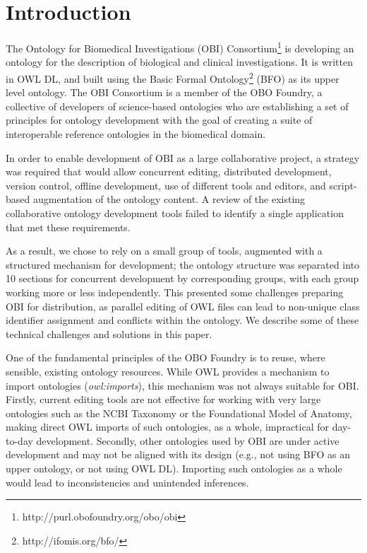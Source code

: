 \documentclass{elsart}       %
\begin{document}
\section{Introduction}
\label{intro}

The Ontology for Biomedical Investigations (OBI) Consortium\footnote{http://purl.obofoundry.org/obo/obi} is developing an ontology for the description of biological and clinical investigations.
It is written in OWL DL, and built using the Basic Formal Ontology\footnote{http://ifomis.org/bfo/} (BFO)\cite{bfo} as its upper level ontology.
The OBI Consortium is a member of the OBO Foundry\cite{foundry}, a collective of developers of science-based ontologies who are establishing a set of principles for ontology development with the goal of creating a suite of interoperable reference ontologies in the biomedical domain. 


In order to enable development of OBI as a large collaborative project, a strategy was required that would allow concurrent editing, distributed development, version control, offline development, use of different tools and editors, and script-based augmentation of the ontology content.
A review of the existing collaborative ontology development tools failed to identify a single application that met these requirements.

As a result, we chose to rely on a small group of tools, augmented with a structured mechanism for development; the ontology structure was separated into 10 sections for concurrent development by corresponding groups, with each group working more or less independently.
This presented some challenges preparing OBI for distribution, as parallel editing of OWL files can lead to non-unique class identifier assignment and conflicts within the ontology. We describe some of these technical challenges and solutions in this paper.

One of the fundamental principles of the OBO Foundry is to reuse, where sensible, existing ontology resources.
While OWL provides a mechanism to import ontologies (\emph{owl:imports}), this mechanism was not always suitable for OBI. Firstly, current editing tools are not effective for working with very large ontologies such as the NCBI Taxonomy\cite{ncbi} or the Foundational Model of Anatomy\cite{fma}, making direct OWL imports of such ontologies, as a whole, impractical for day-to-day development. Secondly, other ontologies used by OBI are under active development and may not be aligned with its design (e.g., not using BFO as an upper ontology, or not using OWL DL). Importing such ontologies as a whole would lead to inconsistencies and unintended inferences. 
\end{document}
